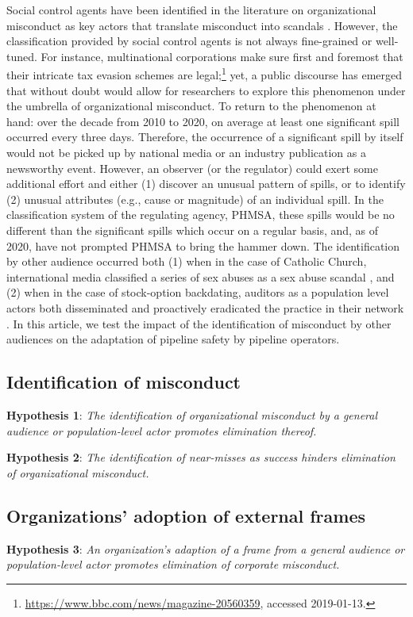 Social control agents have been identified in the literature on organizational misconduct as key actors that translate misconduct into scandals \citep{Greve2010}. However, the classification provided by social control agents is not always fine-grained or well-tuned. For instance, multinational corporations make sure first and foremost that their intricate tax evasion schemes are legal;\footnote{\url{https://www.bbc.com/news/magazine-20560359}, accessed 2019-01-13.} yet, a public discourse has emerged that without doubt would allow for researchers to explore this phenomenon under the umbrella of organizational misconduct. To return to the phenomenon at hand: over the decade from 2010 to 2020, on average at least one significant spill occurred every three days. Therefore, the occurrence of a significant spill by itself would not be picked up by national media or an industry publication as a newsworthy event. However, an observer (or the regulator) could exert some additional effort and either (1) discover an unusual pattern of spills, or to identify (2) unusual attributes (e.g., cause or magnitude) of an individual spill. In the classification system of the regulating agency, PHMSA, these spills would be no different than the significant spills which occur on a regular basis, and, as of 2020, have not prompted PHMSA to bring the hammer down. The identification by other audience occurred both (1) when in the case of Catholic Church, international media classified a series of sex abuses as a sex abuse scandal \citep{Piazza2018}, and (2) when in the case of stock-option backdating, auditors as a population level actors both disseminated and proactively eradicated the practice in their network \citep{Mohliver2019}. In this article, we test the impact of the identification of misconduct by other audiences on the adaptation of pipeline safety by pipeline operators.
	
\subsection{Identification of misconduct}

\textbf{Hypothesis 1}: \textit{The identification of organizational misconduct by a general audience or population-level actor promotes elimination thereof.}

\textbf{Hypothesis 2}: \textit{The identification of near-misses as success hinders elimination of organizational misconduct.}

\subsection{Organizations' adoption of external frames}

\textbf{Hypothesis 3}: \textit{An organization's adaption of a frame from a general audience or population-level actor promotes elimination of corporate misconduct.}